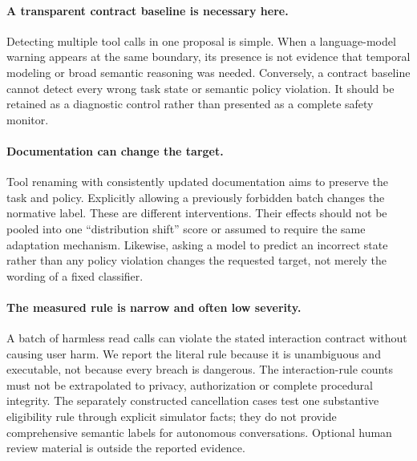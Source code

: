 \documentclass[10pt]{article}
\begin{document}
\paragraph{A transparent contract baseline is necessary here.}
Detecting multiple tool calls in one proposal is simple. When a language-model warning appears at the same boundary, its presence is not evidence that temporal modeling or broad semantic reasoning was needed. Conversely, a contract baseline cannot detect every wrong task state or semantic policy violation. It should be retained as a diagnostic control rather than presented as a complete safety monitor.

\paragraph{Documentation can change the target.}
Tool renaming with consistently updated documentation aims to preserve the task and policy. Explicitly allowing a previously forbidden batch changes the normative label. These are different interventions. Their effects should not be pooled into one ``distribution shift'' score or assumed to require the same adaptation mechanism. Likewise, asking a model to predict an incorrect state rather than any policy violation changes the requested target, not merely the wording of a fixed classifier.

\paragraph{The measured rule is narrow and often low severity.}
A batch of harmless read calls can violate the stated interaction contract without causing user harm. We report the literal rule because it is unambiguous and executable, not because every breach is dangerous. The interaction-rule counts must not be extrapolated to privacy, authorization or complete procedural integrity. The separately constructed cancellation cases test one substantive eligibility rule through explicit simulator facts; they do not provide comprehensive semantic labels for autonomous conversations. Optional human review material is outside the reported evidence.
\end{document}
